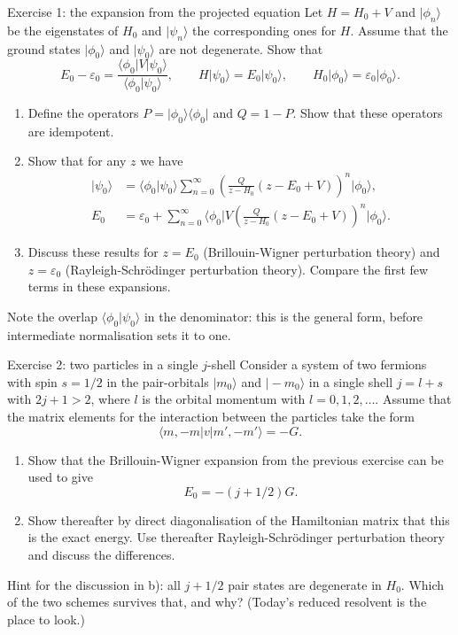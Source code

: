 \documentclass[aspectratio=169,10pt]{beamer}
\newcommand{\mbbox}[1]{%
  \begin{tcolorbox}[colback=paleblue,colframe=uioblue,title={\bfseries Many-body connection}]
  #1
  \end{tcolorbox}}
\newcommand{\ket}[1]{\vert #1\rangle}
\newcommand{\bra}[1]{\langle #1\vert}
\newcommand{\braket}[2]{\langle #1\vert #2\rangle}
\begin{document}
\begin{frame}[shrink=5]{Exercise 1: the expansion from the projected equation}
Let \(H=H_0+V\) and \(\ket{\phi_n}\) be the eigenstates of \(H_0\) and \(\ket{\psi_n}\) the corresponding ones for \(H\). Assume that the ground states \(\ket{\phi_0}\) and \(\ket{\psi_0}\) are not degenerate. Show that
\[
E_0-\varepsilon_0=\frac{\bra{\phi_0}V\ket{\psi_0}}{\braket{\phi_0}{\psi_0}},
\qquad
H\ket{\psi_0}=E_0\ket{\psi_0},\qquad H_0\ket{\phi_0}=\varepsilon_0\ket{\phi_0}.
\]
\begin{enumerate}
\item[a)] Define the operators \(P=\ket{\phi_0}\bra{\phi_0}\) and \(Q=1-P\). Show that these operators are idempotent.
\item[b)] Show that for any \(z\) we have
\begin{align*}
\ket{\psi_0}&=\braket{\phi_0}{\psi_0}\sum_{n=0}^{\infty}\left(\frac{Q}{z-H_0}(z-E_0+V)\right)^n\ket{\phi_0},\\
E_0&=\varepsilon_0+\sum_{n=0}^{\infty}\bra{\phi_0}V\left(\frac{Q}{z-H_0}(z-E_0+V)\right)^n\ket{\phi_0}.
\end{align*}
\item[c)] Discuss these results for \(z=E_0\) (Brillouin-Wigner perturbation theory) and \(z=\varepsilon_0\) (Rayleigh-Schr\"odinger perturbation theory). Compare the first few terms in these expansions.
\end{enumerate}
\small Note the overlap \(\braket{\phi_0}{\psi_0}\) in the denominator: this is the general form, before intermediate normalisation sets it to one.
\end{frame}

\begin{frame}[shrink=4]{Exercise 2: two particles in a single \(j\)-shell}
Consider a system of two fermions with spin \(s=1/2\) in the pair-orbitals \(\ket{m_0}\) and \(\ket{-m_0}\) in a single shell \(j=l+s\) with \(2j+1>2\), where \(l\) is the orbital momentum with \(l=0,1,2,\dots\). Assume that the matrix elements for the interaction between the particles take the form
\[
\bra{m,-m}v\ket{m',-m'}=-G .
\]
\begin{enumerate}
\item[a)] Show that the Brillouin-Wigner expansion from the previous exercise can be used to give
\[
E_0=-(j+1/2)G .
\]
\item[b)] Show thereafter by direct diagonalisation of the Hamiltonian matrix that this is the exact energy. Use thereafter Rayleigh-Schr\"odinger perturbation theory and discuss the differences.
\end{enumerate}
\mbbox{Hint for the discussion in b): all \(j+1/2\) pair states are degenerate in \(H_0\). Which of the two schemes survives that, and why? (Today's reduced resolvent is the place to look.)}
\end{frame}
\end{document}
